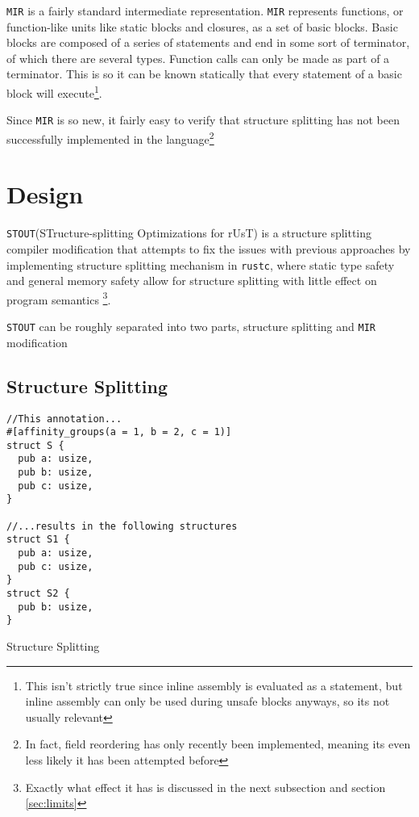 \documentclass[prodmode,acmtecs]{acmsmall} %
\newcommand{\rustcname}{{\texttt{rustc}}}
\def \rustc {\rustcname{}\xspace}
\newcommand{\mirname}{{\texttt{MIR}}}
\def \mir {\mirname{}\xspace}
\newcommand{\projectname}{{\texttt{STOUT}}}
\def \name{\projectname\xspace}
\begin{document}
\mir is a fairly standard intermediate representation. \mir represents functions, 
or function-like units like static blocks and closures, 
as a set of basic blocks. Basic blocks are composed of a series of statements
and end in some sort of terminator, of which there are several types. 
Function calls can only be made as part of a terminator. This is
so it can be known statically that every statement of a basic block will
execute\footnote{This isn't strictly true since inline assembly is evaluated as
  a statement, but inline assembly can only be used during unsafe blocks
  anyways, so its not usually relevant}.

  Since \mir is so new, it fairly easy to verify that structure splitting has
  not been successfully implemented in the language\footnote{In fact, field
  reordering has only recently been implemented, meaning its even less
  likely it has been attempted before}

\section{Design}

\name (STructure-splitting Optimizations for rUsT) is a structure 
splitting compiler modification that attempts to fix the issues with
previous approaches by implementing structure splitting 
mechanism in \rustc, where static type
safety and general memory safety allow for 
structure splitting with little effect on program
semantics
\footnote{Exactly what effect it has is discussed in the next subsection and section \ref{sec:limits}}.

\name can be roughly separated into 
two parts, 
structure splitting
and \mir modification

\subsection{Structure Splitting}

\begin{listing}[h]
\begin{verbatim}
//This annotation...
#[affinity_groups(a = 1, b = 2, c = 1)]
struct S {
  pub a: usize,
  pub b: usize,
  pub c: usize,
}

//...results in the following structures
struct S1 {
  pub a: usize,
  pub c: usize,
}
struct S2 {
  pub b: usize,
}
\end{verbatim}
  \caption{Structure Splitting}
  \label{fig:split}
\end{listing}
\end{document}
